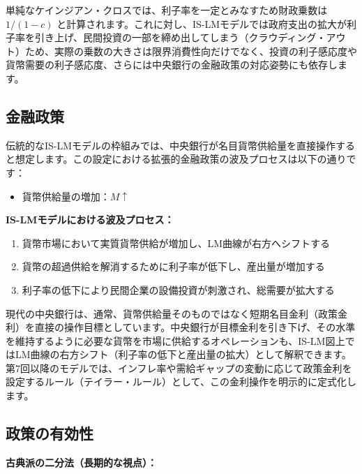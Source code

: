 \documentclass[
  japanese,
  lualatex,
  ja=standard,
  12pt,
  a4paper]{ltjsarticle}
\providecommand{\tightlist}{%
  \setlength{\itemsep}{0pt}\setlength{\parskip}{0pt}}
\begin{document}
単純なケインジアン・クロスでは、利子率を一定とみなすため財政乗数は
\(1/(1-c)\)
と計算されます。これに対し、IS-LMモデルでは政府支出の拡大が利子率を引き上げ、民間投資の一部を締め出してしまう（クラウディング・アウト）ため、実際の乗数の大きさは限界消費性向だけでなく、投資の利子感応度や貨幣需要の利子感応度、さらには中央銀行の金融政策の対応姿勢にも依存します。

\subsection{金融政策}\label{ux91d1ux878dux653fux7b56}

伝統的なIS-LMモデルの枠組みでは、中央銀行が名目貨幣供給量を直接操作すると想定します。この設定における拡張的金融政策の波及プロセスは以下の通りです：

\begin{itemize}
\tightlist
\item
  貨幣供給量の増加：\(M \uparrow\)
\end{itemize}


\textbf{IS-LMモデルにおける波及プロセス：}

\begin{enumerate}
\def\labelenumi{\arabic{enumi}.}
\tightlist
\item
  貨幣市場において実質貨幣供給が増加し、LM曲線が右方へシフトする
\item
  貨幣の超過供給を解消するために利子率が低下し、産出量が増加する
\item
  利子率の低下により民間企業の設備投資が刺激され、総需要が拡大する
\end{enumerate}

現代の中央銀行は、通常、貨幣供給量そのものではなく短期名目金利（政策金利）を直接の操作目標としています。中央銀行が目標金利を引き下げ、その水準を維持するように必要な貨幣を市場に供給するオペレーションも、IS-LM図上ではLM曲線の右方シフト（利子率の低下と産出量の拡大）として解釈できます。第7回以降のモデルでは、インフレ率や需給ギャップの変動に応じて政策金利を設定するルール（テイラー・ルール）として、この金利操作を明示的に定式化します。


\subsection{政策の有効性}\label{ux653fux7b56ux306eux6709ux52b9ux6027}

\textbf{古典派の二分法（長期的な視点）：}
\end{document}
